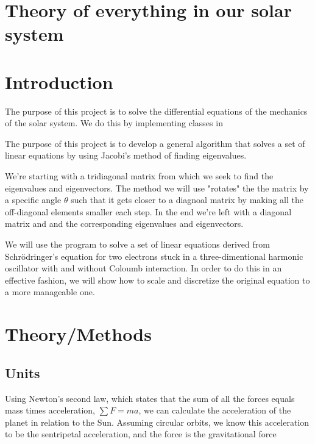 \documentclass[10pt]{article}
\begin{document}
\begin{multicols}{2}

\section{Theory of everything in our solar system}

\section{Introduction}
The purpose of this project is to solve the differential equations of the
mechanics of the solar system. We do this by implementing classes in 

    The purpose of this project is to develop a general algorithm that
    solves a set of linear equations by using Jacobi's method of finding
    eigenvalues. 

We're starting with a tridiagonal matrix from which we seek to find the
eigenvalues and eigenvectors. The method we will use "rotates" the the
matrix by a specific angle $\theta$ such that it gets closer to a diagnoal
matrix by making all the off-diagonal elements smaller each step. In the
end we're left with a diagonal matrix and and the corresponding eigenvalues
and eigenvectors.

We will use the program to solve a set of linear equations derived from
Schrödringer's equation for two electrons stuck in a three-dimentional
harmonic oscillator with and without Coloumb interaction. In order to do
this in an effective fashion, we will show how to scale and discretize the
original equation to a more manageable one.



\section{Theory/Methods}
\subsection{Units}
Using Newton's second law, which states that the sum of all the forces
equals mass times acceleration, $\sum F=ma$, we can calculate the
acceleration of the planet in relation to the Sun. Assuming circular
orbits, we know this acceleration to be the sentripetal acceleration, and
the force is the gravitational force


\end{multicols}
\end{document}
